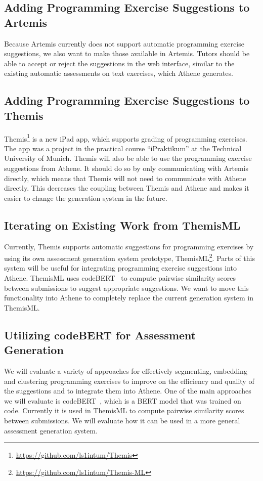 \subsection*{Adding Programming Exercise Suggestions to Artemis}
Because Artemis currently does not support automatic programming exercise suggestions, we also want to make those available in Artemis. Tutors should be able to accept or reject the suggestions in the web interface, similar to the existing automatic assessments on text exercises, which Athene generates. 

\subsection*{Adding Programming Exercise Suggestions to Themis}

Themis\footnote{\url{https://github.com/ls1intum/Themis}} is a new iPad app, which supports grading of programming exercises. The app was a project in the practical course \enquote{iPraktikum} at the Technical University of Munich.
Themis will also be able to use the programming exercise suggestions from Athene. It should do so by only communicating with Artemis directly, which means that Themis will not need to communicate with Athene directly. This decreases the coupling between Themis and Athene and makes it easier to change the generation system in the future.

\subsection*{Iterating on Existing Work from ThemisML}
Currently, Themis supports automatic suggestions for programming exercises by using its own assessment generation system prototype, ThemisML\footnote{\url{https://github.com/ls1intum/Themis-ML}}.
Parts of this system will be useful for integrating programming exercise suggestions into Athene. ThemisML uses codeBERT~\cite{codeBERT} to compute pairwise similarity scores between submissions to suggest appropriate suggestions. We want to move this functionality into Athene to completely replace the current generation system in ThemisML.

\subsection*{Utilizing codeBERT for Assessment Generation}
We will evaluate a variety of approaches for effectively segmenting, embedding and clustering programming exercises to improve on the efficiency and quality of the suggestions and to integrate them into Athene.
One of the main approaches we will evaluate is codeBERT~\cite{codeBERT}, which is a BERT model that was trained on code. Currently it is used in ThemisML to compute pairwise similarity scores between submissions. We will evaluate how it can be used in a more general assessment generation system.


